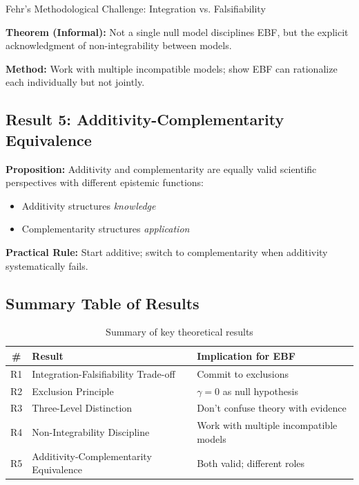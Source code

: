 \begin{chapter}{Fehr's Methodological Challenge: Integration vs. Falsifiability}
\begin{tcolorbox}[colback=gray!10!white,colframe=gray!75!black]
\textbf{Theorem (Informal):} Not a single null model disciplines EBF, but the explicit acknowledgment of non-integrability between models.

\textbf{Method:} Work with multiple incompatible models; show EBF can rationalize each individually but not jointly.
\end{tcolorbox}

\subsection{Result 5: Additivity-Complementarity Equivalence}

\begin{tcolorbox}[colback=gray!10!white,colframe=gray!75!black]
\textbf{Proposition:} Additivity and complementarity are equally valid scientific perspectives with different epistemic functions:
\begin{itemize}[noitemsep]
    \item Additivity structures \textit{knowledge}
    \item Complementarity structures \textit{application}
\end{itemize}

\textbf{Practical Rule:} Start additive; switch to complementarity when additivity systematically fails.
\end{tcolorbox}

\subsection{Summary Table of Results}

\begin{table}[h!]
\centering
\renewcommand{\arraystretch}{1.3}
\begin{tabular}{clp{7cm}}
\toprule
\textbf{\#} & \textbf{Result} & \textbf{Implication for EBF} \\
\midrule
R1 & Integration-Falsifiability Trade-off & Commit to exclusions \\
R2 & Exclusion Principle & $\gamma = 0$ as null hypothesis \\
R3 & Three-Level Distinction & Don't confuse theory with evidence \\
R4 & Non-Integrability Discipline & Work with multiple incompatible models \\
R5 & Additivity-Complementarity Equivalence & Both valid; different roles \\
\bottomrule
\end{tabular}
\caption{Summary of key theoretical results}
\end{table}



\end{chapter}

